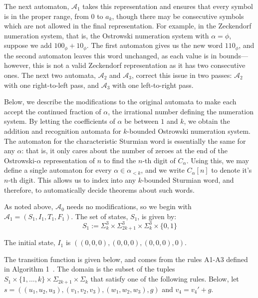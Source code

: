\documentclass[a4paper]{article}
\theoremstyle{definition}
\theoremstyle{remark}
\theoremstyle{remark}
\theoremstyle{plain}
\begin{document}
The next automaton, $\mathcal{A}_1$ takes this representation and ensures that every symbol is in the proper range, from $0$ to $a_k$, though there may be consecutive symbols which are not allowed in the final representation.
For example, in the Zeckendorf numeration system, that is, the Ostrowski numeration system with $\alpha = \phi$, suppose we add $100_{\phi} + 10_{\phi}$.
The first automaton gives us the new word $110_{\phi}$, and the second automaton leaves this word unchanged, as each value is in bounds---however, this is not a valid Zeckendorf representation as it has two consecutive ones.
The next two automata, $\mathcal{A}_2$ and $\mathcal{A}_3$, correct this issue in two passes: $\mathcal{A}_2$ with one right-to-left pass, and $\mathcal{A}_3$ with one left-to-right pass.

Below, we describe the modifications to the original automata to make each accept the continued fraction of $\alpha$, the irrational number defining the numeration system.
By letting the coefficients of $\alpha$ be between $1$ and $k$, we obtain the addition and recognition automata for $k$-bounded Ostrowski numeration system.
The automaton for the characteristic Sturmian word is essentially the same for any $\alpha$: that is, it only cares about the number of zeroes at the end of the Ostrowski-$\alpha$ representation of $n$ to find the $n$-th digit of $C_{\alpha}$.
Using this, we may define a single automaton for every $\alpha \in \alpha_{<k}$, and we write $C_{\alpha}[n]$ to denote it's $n$-th digit.
This allows us to index into any $k$-bounded Sturmian word, and therefore, to automatically decide theorems about such words.

As noted above, $\mathcal{A}_0$ needs no modifications, so we begin with $\mathcal{A}_1 = (S_1, I_1, T_1, F_1)$.
The set of states, $S_1$, is given by:
\begin{equation*}\label{def:alg1-states}
    S_1 := \Sigma_k^3 \times \Sigma_{2k+1}^3 \times \Sigma_k^3 \times \{0,1\}
\end{equation*}

The initial state, $I_1$ is $((0,0,0),(0,0,0),(0,0,0),0)$.

The transition function is given below, and comes from the rules A1-A3 defined in Algorithm 1~\cite{ht-ostrowski}.
The domain is the subset of the tuples $S_1 \times \{1,\ldots,k\} \times \Sigma_{2k+1} \times \Sigma_k$ that satisfy one of the following rules.
Below, let $s = ((u_1,u_2,u_3),(v_1,v_2,v_3),(w_1,w_2,w_3),g)$ and $v_4 = v_4' + g$.
\end{document}
